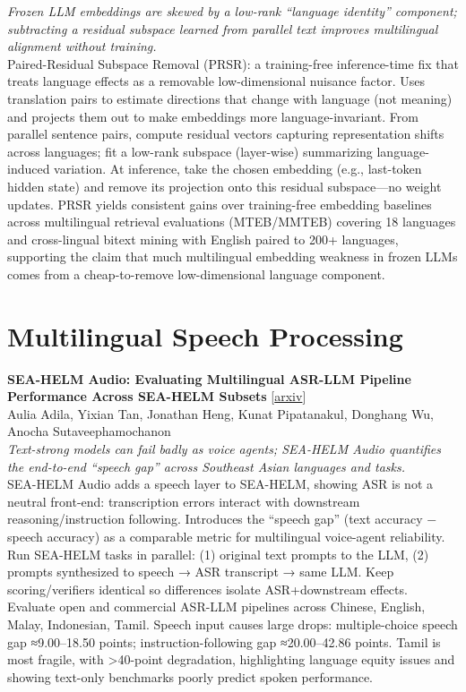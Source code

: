 \documentclass[12pt,letterpaper]{article}
\begin{document}
{\small\textit{Frozen LLM embeddings are skewed by a low-rank ``language identity'' component; subtracting a residual subspace learned from parallel text improves multilingual alignment without training.}}\\[1pt]
{\footnotesize Paired-Residual Subspace Removal (PRSR): a training-free inference-time fix that treats language effects as a removable low-dimensional nuisance factor. Uses translation pairs to estimate directions that change with language (not meaning) and projects them out to make embeddings more language-invariant. From parallel sentence pairs, compute residual vectors capturing representation shifts across languages; fit a low-rank subspace (layer-wise) summarizing language-induced variation. At inference, take the chosen embedding (e.g., last-token hidden state) and remove its projection onto this residual subspace---no weight updates. PRSR yields consistent gains over training-free embedding baselines across multilingual retrieval evaluations (MTEB/MMTEB) covering 18 languages and cross-lingual bitext mining with English paired to 200+ languages, supporting the claim that much multilingual embedding weakness in frozen LLMs comes from a cheap-to-remove low-dimensional language component.}

\medskip


\section*{Multilingual Speech Processing}

{\small\textbf{SEA-HELM Audio: Evaluating Multilingual ASR-LLM Pipeline Performance Across SEA-HELM Subsets}} {\scriptsize[\href{https://arxiv.org/abs/2610.19869}{arxiv}]}\\
{\scriptsize Aulia Adila, Yixian Tan, Jonathan Heng, Kunat Pipatanakul, Donghang Wu, Anocha Sutaveephamochanon}\\

{\small\textit{Text-strong models can fail badly as voice agents; SEA-HELM Audio quantifies the end-to-end ``speech gap'' across Southeast Asian languages and tasks.}}\\[1pt]
{\footnotesize SEA-HELM Audio adds a speech layer to SEA-HELM, showing ASR is not a neutral front-end: transcription errors interact with downstream reasoning/instruction following. Introduces the ``speech gap'' (text accuracy − speech accuracy) as a comparable metric for multilingual voice-agent reliability. Run SEA-HELM tasks in parallel: (1) original text prompts to the LLM, (2) prompts synthesized to speech → ASR transcript → same LLM. Keep scoring/verifiers identical so differences isolate ASR+downstream effects. Evaluate open and commercial ASR-LLM pipelines across Chinese, English, Malay, Indonesian, Tamil. Speech input causes large drops: multiple-choice speech gap ≈9.00--18.50 points; instruction-following gap ≈20.00--42.86 points. Tamil is most fragile, with >40-point degradation, highlighting language equity issues and showing text-only benchmarks poorly predict spoken performance.}
\end{document}
